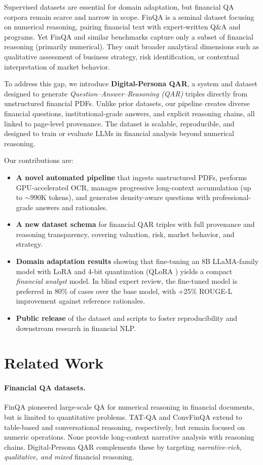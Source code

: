 \documentclass[sigconf,authordraft,anonymous]{acmart}
\begin{document}
Supervised datasets are essential for domain adaptation, but financial QA corpora remain scarce and narrow in scope. FinQA \cite{chen2022finqadatasetnumericalreasoning} is a seminal dataset focusing on numerical reasoning, pairing financial text with expert-written Q\&A and programs. Yet FinQA and similar benchmarks capture only a subset of financial reasoning (primarily numerical). They omit broader analytical dimensions such as qualitative assessment of business strategy, risk identification, or contextual interpretation of market behavior.

To address this gap, we introduce \textbf{Digital-Persona QAR}, a system and dataset designed to generate \emph{Question--Answer--Reasoning (QAR)} triples directly from unstructured financial PDFs. Unlike prior datasets, our pipeline creates diverse financial questions, institutional-grade answers, and explicit reasoning chains, all linked to page-level provenance. The dataset is scalable, reproducible, and designed to train or evaluate LLMs in financial analysis beyond numerical reasoning.

Our contributions are:
\begin{itemize}
  \item \textbf{A novel automated pipeline} that ingests unstructured PDFs, performs GPU-accelerated OCR, manages progressive long-context accumulation (up to $\sim$990K tokens), and generates density-aware questions with professional-grade answers and rationales.
  \item \textbf{A new dataset schema} for financial QAR triples with full provenance and reasoning transparency, covering valuation, risk, market behavior, and strategy.
  \item \textbf{Domain adaptation results} showing that fine-tuning an 8B LLaMA-family model with LoRA and 4-bit quantization (QLoRA \cite{dettmers2023qloraefficientfinetuningquantized}) yields a compact \emph{financial analyst} model. In blind expert review, the fine-tuned model is preferred in 80\% of cases over the base model, with +25\% ROUGE-L improvement against reference rationales.
  \item \textbf{Public release} of the dataset and scripts to foster reproducibility and downstream research in financial NLP.
\end{itemize}

\section{Related Work}
\paragraph{Financial QA datasets.}
FinQA \cite{chen2022finqadatasetnumericalreasoning} pioneered large-scale QA for numerical reasoning in financial documents, but is limited to quantitative problems. TAT-QA and ConvFinQA extend to table-based and conversational reasoning, respectively, but remain focused on numeric operations. None provide long-context narrative analysis with reasoning chains. Digital-Persona QAR complements these by targeting \emph{narrative-rich, qualitative, and mixed} financial reasoning.
\end{document}
